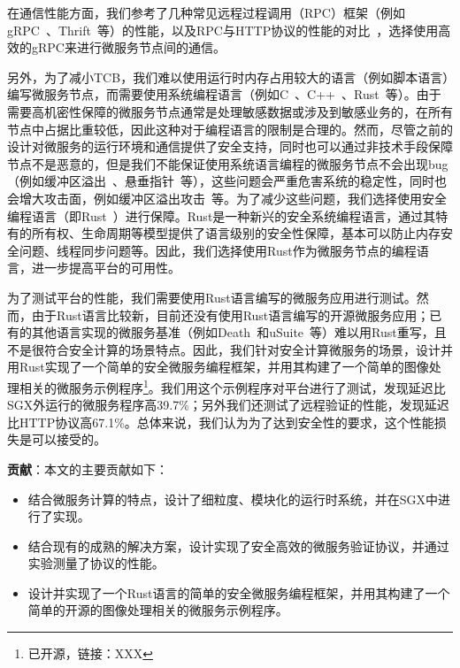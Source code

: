 在通信性能方面，我们参考了几种常见远程过程调用（RPC）框架（例如gRPC~\cite{}、Thrift~\cite{}等）的性能，以及RPC与HTTP协议的性能的对比~\cite{}，选择使用高效的gRPC来进行微服务节点间的通信。

另外，为了减小TCB，我们难以使用运行时内存占用较大的语言（例如脚本语言）编写微服务节点，而需要使用系统编程语言（例如C~\cite{}、C++~\cite{}、Rust~\cite{}等）。由于需要高机密性保障的微服务节点通常是处理敏感数据或涉及到敏感业务的，在所有节点中占据比重较低，因此这种对于编程语言的限制是合理的。然而，尽管之前的设计对微服务的运行环境和通信提供了安全支持，同时也可以通过非技术手段保障节点不是恶意的，但是我们不能保证使用系统语言编程的微服务节点不会出现bug（例如缓冲区溢出~\cite{}、悬垂指针~\cite{}等），这些问题会严重危害系统的稳定性，同时也会增大攻击面，例如缓冲区溢出攻击~\cite{}等。为了减少这些问题，我们选择使用安全编程语言（即Rust~\cite{}）进行保障。Rust是一种新兴的安全系统编程语言，通过其特有的所有权、生命周期等模型提供了语言级别的安全性保障，基本可以防止内存安全问题、线程同步问题等。因此，我们选择使用Rust作为微服务节点的编程语言，进一步提高平台的可用性。

为了测试平台的性能，我们需要使用Rust语言编写的微服务应用进行测试。然而，由于Rust语言比较新，目前还没有使用Rust语言编写的开源微服务应用；已有的其他语言实现的微服务基准（例如Death~\cite{}和uSuite~\cite{}等）难以用Rust重写，且不是很符合安全计算的场景特点。因此，我们针对安全计算微服务的场景，设计并用Rust实现了一个简单的安全微服务编程框架，并用其构建了一个简单的图像处理相关的微服务示例程序\footnote{已开源，链接：XXX}。我们用这个示例程序对平台进行了测试，发现延迟比SGX外运行的微服务程序高39.7\%；另外我们还测试了远程验证的性能，发现延迟比HTTP协议高67.1\%。总体来说，我们认为为了达到安全性的要求，这个性能损失是可以接受的。


\textbf{贡献}：本文的主要贡献如下：
\begin{itemize}
    \item 结合微服务计算的特点，设计了细粒度、模块化的运行时系统，并在SGX中进行了实现。
    \item 结合现有的成熟的解决方案，设计实现了安全高效的微服务验证协议，并通过实验测量了协议的性能。
    \item 设计并实现了一个Rust语言的简单的安全微服务编程框架，并用其构建了一个简单的开源的图像处理相关的微服务示例程序。
\end{itemize}




